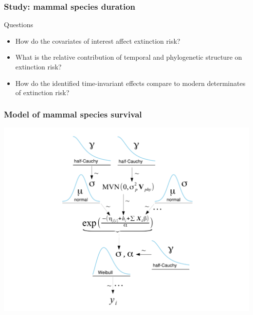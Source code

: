 \documentclass{beamer}
\begin{document}
\begin{frame}
  \frametitle{Study: mammal species duration}
  \begin{alertblock}{Questions}
    \begin{itemize}
      \item How do the covariates of interest affect extinction risk?
      \item What is the relative contribution of temporal and phylogenetic structure on extinction risk?
      \item How do the identified time-invariant effects compare to modern determinates of extinction risk?
    \end{itemize}
  \end{alertblock}
\end{frame}

\begin{frame}
  \frametitle{Model of mammal species survival}
  \includegraphics[width=\textwidth,height=0.8\textheight,keepaspectratio=true]{figure/mammal_survival_model}
\end{frame}
\end{document}
